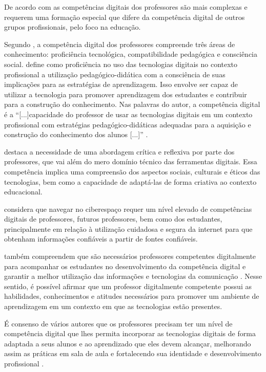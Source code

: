 \documentclass[portuguese]{textolivre}
\begin{document}
De acordo com \textcite{krumsvik2009,estevemon2016b} as
competências digitais dos professores são mais complexas e requerem uma
formação especial que difere da competência digital de outros grupos
profissionais, pelo foco na educação.

Segundo \textcite{instefjord2016}, a competência digital dos
professores compreende três áreas de conhecimento: proficiência
tecnológica, compatibilidade pedagógica e consciência social. \textcite{krumsvik2009,krumsvik2011} define como proficiência no uso das tecnologias digitais no
contexto profissional a utilização pedagógico-didática com a consciência
de suas implicações para as estratégias de aprendizagem. Isso envolve
ser capaz de utilizar a tecnologia para promover aprendizagem dos
estudantes e contribuir para a construção do conhecimento. Nas palavras
do autor, a competência digital é a ``{[}...{]}capacidade do professor
de usar as tecnologias digitais em um contexto profissional com
estratégias pedagógico-didáticas adequadas para a aquisição e construção
do conhecimento dos alunos {[}...{]}'' \cite[p.~177, tradução
nossa]{krumsvik2009}.

\textcite{engen2019} destaca a necessidade de uma abordagem crítica e reflexiva
por parte dos professores, que vai além do mero domínio técnico das
ferramentas digitais. Essa competência implica uma compreensão dos
aspectos sociais, culturais e éticos das tecnologias, bem como a
capacidade de adaptá-las de forma criativa ao contexto educacional.

\textcite{nowak2019} considera que navegar no ciberespaço
requer um nível elevado de competências digitais de professores, futuros
professores, bem como dos estudantes, principalmente em relação à
utilização cuidadosa e segura da internet para que obtenham informações
confiáveis a partir de fontes confiáveis.

\textcite{fraile2018} também compreendem que são
necessários professores competentes digitalmente para acompanhar os
estudantes no desenvolvimento da competência digital e garantir a melhor
utilização das informações e tecnologias da comunicação
\cite{fraile2018}. Nesse sentido, é possível afirmar que um professor
digitalmente competente possui as habilidades, conhecimentos e atitudes
necessários para promover um ambiente de aprendizagem em um contexto em
que as tecnologias estão presentes.

É consenso de vários autores que os professores precisam ter um nível de
competência digital que lhes permita incorporar as tecnologias digitais
de forma adaptada a seus alunos e ao aprendizado que eles devem
alcançar, melhorando assim as práticas em sala de aula e fortalecendo
sua identidade e desenvolvimento profissional
\cite{redecker2009,estevemon2016b,cantabrana2015,silva2019a}.
\end{document}
